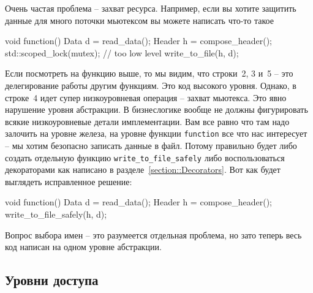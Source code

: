 Очень частая проблема -- захват ресурса.
Например, если вы хотите защитить данные для много поточки мьютексом вы можете написать что-то такое
\begin{cppcode}
void function() {
  Data d = read_data();
  Header h = compose_header();
  std::scoped_lock(mutex); // too low level
  write_to_file(h, d);
}
\end{cppcode}
Если посмотреть на функцию выше, то мы видим, что строки~2, 3 и~5 -- это делегирование работы другим функциям.
Это код высокого уровня.
Однако, в строке~4 идет супер низкоуровневая операция -- захват мьютекса.
Это явно нарушение уровня абстракции.
В бизнеслогике вообще не должны фигурировать всякие низкоуровневые детали имплементации.
Вам все равно что там надо залочить на уровне железа, на уровне функции \verb"function" все что нас интересует -- мы хотим безопасно записать данные в файл.
Потому правильно будет либо создать отдельную функцию \verb"write_to_file_safely" либо воспользоваться декораторами как написано в разделе~\ref{section::Decorators}.
Вот как будет выглядеть исправленное решение:
\begin{cppcode}
void function() {
  Data d = read_data();
  Header h = compose_header();
  write_to_file_safely(h, d);
}
\end{cppcode}
Вопрос выбора имен -- это разумеется отдельная проблема, но зато теперь весь код написан на одном уровне абстракции.

\subsection{Уровни доступа}
\label{section::AccessLevels}

